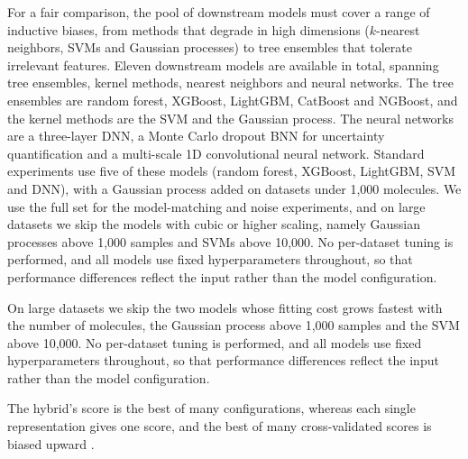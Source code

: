 For a fair comparison, the pool of downstream models must cover a range of inductive biases, from methods that degrade in high dimensions ($k$-nearest neighbors, SVMs and Gaussian processes) to tree ensembles that tolerate irrelevant features. Eleven downstream models are available in total, spanning tree ensembles, kernel methods, nearest neighbors and neural networks. The tree ensembles are random forest, XGBoost, LightGBM, CatBoost and NGBoost, and the kernel methods are the SVM and the Gaussian process. The neural networks are a three-layer DNN, a Monte Carlo dropout BNN for uncertainty quantification and a multi-scale 1D convolutional neural network. Standard experiments use five of these models (random forest, XGBoost, LightGBM, SVM and DNN), with a Gaussian process added on datasets under 1,000 molecules. We use the full set for the model-matching and noise experiments, and on large datasets we skip the models with cubic or higher scaling, namely Gaussian processes above 1,000 samples and SVMs above 10,000. No per-dataset tuning is performed, and all models use fixed hyperparameters throughout, so that performance differences reflect the input rather than the model configuration.

On large datasets we skip the two models whose fitting cost grows fastest with the number of molecules, the Gaussian process above 1,000 samples and the SVM above 10,000. No per-dataset tuning is performed, and all models use fixed hyperparameters throughout, so that performance differences reflect the input rather than the model configuration.

The hybrid's score is the best of many configurations, whereas each single representation gives one score, and the best of many cross-validated scores is biased upward \citep{Varma2006}.

